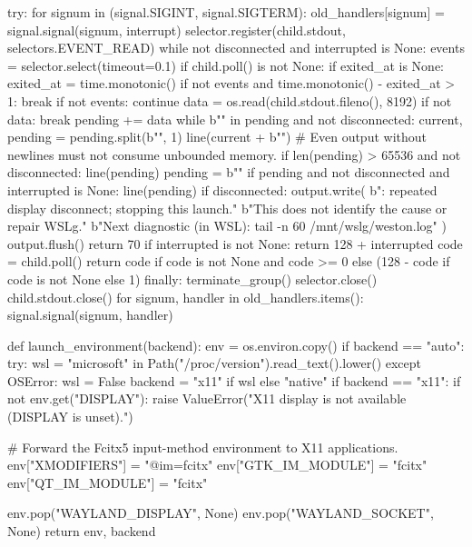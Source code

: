     try:
        for signum in (signal.SIGINT, signal.SIGTERM):
            old_handlers[signum] = signal.signal(signum, interrupt)
        selector.register(child.stdout, selectors.EVENT_READ)
        while not disconnected and interrupted is None:
            events = selector.select(timeout=0.1)
            if child.poll() is not None:
                if exited_at is None:
                    exited_at = time.monotonic()
                if not events and time.monotonic() - exited_at > 1:
                    break
            if not events:
                continue
            data = os.read(child.stdout.fileno(), 8192)
            if not data:
                break
            pending += data
            while b"\n" in pending and not disconnected:
                current, pending = pending.split(b"\n", 1)
                line(current + b"\n")
            # Even output without newlines must not consume unbounded memory.
            if len(pending) > 65536 and not disconnected:
                line(pending)
                pending = b""
        if pending and not disconnected and interrupted is None:
            line(pending)
        if disconnected:
            output.write(
                b"\nYohaku: repeated display disconnect; stopping this launch.\n"
                b"This does not identify the cause or repair WSLg.\n"
                b"Next diagnostic (in WSL): tail -n 60 /mnt/wslg/weston.log\n"
            )
            output.flush()
            return 70
        if interrupted is not None:
            return 128 + interrupted
        code = child.poll()
        return code if code is not None and code >= 0 else (128 - code if code is not None else 1)
    finally:
        terminate_group()
        selector.close()
        child.stdout.close()
        for signum, handler in old_handlers.items():
            signal.signal(signum, handler)


def launch_environment(backend):
    env = os.environ.copy()
    if backend == "auto":
        try: wsl = "microsoft" in Path("/proc/version").read_text().lower()
        except OSError: wsl = False
        backend = "x11" if wsl else "native"
    if backend == "x11":
        if not env.get("DISPLAY"):
            raise ValueError("X11 display is not available (DISPLAY is unset).")

        # Forward the Fcitx5 input-method environment to X11 applications.
        env["XMODIFIERS"] = "@im=fcitx"
        env["GTK_IM_MODULE"] = "fcitx"
        env["QT_IM_MODULE"] = "fcitx"

        env.pop("WAYLAND_DISPLAY", None)
        env.pop("WAYLAND_SOCKET", None)
    return env, backend


